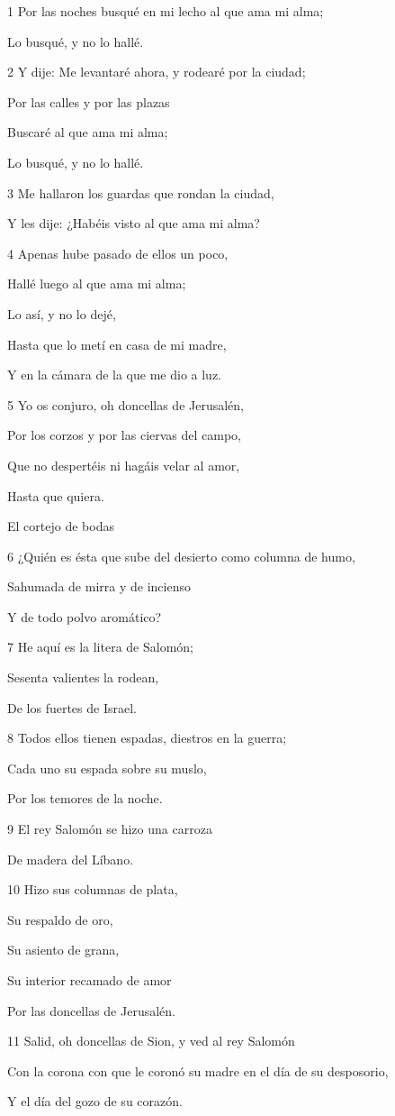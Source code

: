 \par 1 Por las noches busqué en mi lecho al que ama mi alma;
\par Lo busqué, y no lo hallé.
\par 2 Y dije: Me levantaré ahora, y rodearé por la ciudad;
\par Por las calles y por las plazas
\par Buscaré al que ama mi alma; 
\par Lo busqué, y no lo hallé.
\par 3 Me hallaron los guardas que rondan la ciudad,
\par Y les dije: ¿Habéis visto al que ama mi alma?
\par 4 Apenas hube pasado de ellos un poco,
\par Hallé luego al que ama mi alma;
\par Lo así, y no lo dejé,
\par Hasta que lo metí en casa de mi madre,
\par Y en la cámara de la que me dio a luz.
\par 5 Yo os conjuro, oh doncellas de Jerusalén,
\par Por los corzos y por las ciervas del campo,
\par Que no despertéis ni hagáis velar al amor,
\par Hasta que quiera.
\par El cortejo de bodas 
\par 6 ¿Quién es ésta que sube del desierto como columna de humo,
\par Sahumada de mirra y de incienso
\par Y de todo polvo aromático?
\par 7 He aquí es la litera de Salomón;
\par Sesenta valientes la rodean,
\par De los fuertes de Israel.
\par 8 Todos ellos tienen espadas, diestros en la guerra; 
\par Cada uno su espada sobre su muslo,
\par Por los temores de la noche.
\par 9 El rey Salomón se hizo una carroza
\par De madera del Líbano.
\par 10 Hizo sus columnas de plata,
\par Su respaldo de oro,
\par Su asiento de grana,
\par Su interior recamado de amor
\par Por las doncellas de Jerusalén.
\par 11 Salid, oh doncellas de Sion, y ved al rey Salomón
\par Con la corona con que le coronó su madre en el día de su desposorio,
\par Y el día del gozo de su corazón. 

